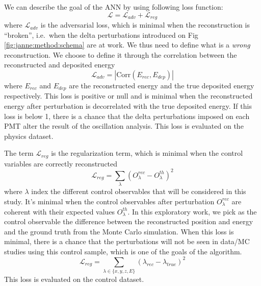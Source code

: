 \documentclass[../main.tex]{subfiles}
\begin{document}
We can describe the goal of the ANN by using following loss function:
\begin{equation}
  \label{eq:janne:loss}
  \mathcal{L} = \mathcal{L}_{adv} + \mathcal{L}_{reg}
\end{equation}
where $\mathcal{L}_{adv}$ is the adversarial loss, which is minimal when the reconstruction is ``broken'', i.e.\ when the delta perturbations introduced on Fig \ref{fig:janne:method:schema} are at work. We thus need to define what is a \textit{wrong} reconstruction. We choose to define it through the correlation between the reconstructed and deposited energy
\begin{equation}
  \label{eq:janne:ladv}
  \mathcal{L}_{adv} = |\mathrm{Corr}(E_{rec}, E_{dep})|
\end{equation}
where $E_{rec}$ and $E_{dep}$ are the reconstructed energy and the true deposited energy respectively.
This loss is positive or null and is minimal when the reconstructed energy after perturbation is decorrelated with the true deposited energy. If this loss is below 1, there is a chance that the delta perturbations imposed on each PMT alter the result of the oscillation analysis. This loss is evaluated on the physics dataset.

The term $\mathcal{L}_{reg}$ is the regularization term, which is minimal when the control variables are correctly reconstructed
\begin{equation}
  \mathcal{L}_{reg} = \sum_\lambda (O^{rec}_\lambda - O^{th}_\lambda)^2
\end{equation}
where $\lambda$ index the different control observables that will be considered in this study. It's minimal when the control observables after perturbation $O^{rec}_\lambda$ are coherent with their expected values $O^{th}_\lambda$.
In this exploratory work, we pick as the control observable the difference between the reconstructed position and energy and the ground truth from the Monte Carlo simulation. When this loss is minimal, there is a chance that the perturbations will not be seen in data/MC  studies using this control sample, which is one of the goals of the algorithm.
\begin{equation}
  \label{eq:janne:lreg}
  \mathcal{L}_{reg} = \sum_{\lambda \in \{x, y, z, E\}} (\lambda_{rec} - \lambda_{true})^2
\end{equation}
This loss is evaluated on the control dataset.
\end{document}
